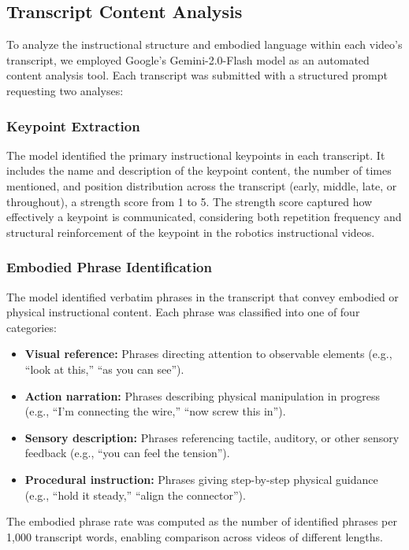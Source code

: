 \documentclass[fleqn,10pt]{JLA_article} %
\begin{document}
\subsection{Transcript Content Analysis}

To analyze the instructional structure and embodied language within each video's transcript, we employed Google's Gemini-2.0-Flash model \cite{gemini2024} as an automated content analysis tool. Each transcript was submitted with a structured prompt requesting two analyses:

\subsubsection{Keypoint Extraction}
The model identified the primary instructional keypoints in each transcript. It includes the name and description of the keypoint content, the number of times mentioned, and position distribution across the transcript (early, middle, late, or throughout), a strength score from 1 to 5. The strength score captured how effectively a keypoint is communicated, considering both repetition frequency and structural reinforcement of the keypoint in the robotics instructional videos.

\subsubsection{Embodied Phrase Identification}
The model identified verbatim phrases in the transcript that convey embodied or physical instructional content. Each phrase was classified into one of four categories:
\begin{itemize}[noitemsep]
    \item \textbf{Visual reference:} Phrases directing attention to observable elements (e.g., ``look at this,'' ``as you can see'').
    \item \textbf{Action narration:} Phrases describing physical manipulation in progress (e.g., ``I'm connecting the wire,'' ``now screw this in'').
    \item \textbf{Sensory description:} Phrases referencing tactile, auditory, or other sensory feedback (e.g., ``you can feel the tension'').
    \item \textbf{Procedural instruction:} Phrases giving step-by-step physical guidance (e.g., ``hold it steady,'' ``align the connector'').
\end{itemize}

The embodied phrase rate was computed as the number of identified phrases per 1{,}000 transcript words, enabling comparison across videos of different lengths.
\end{document}
